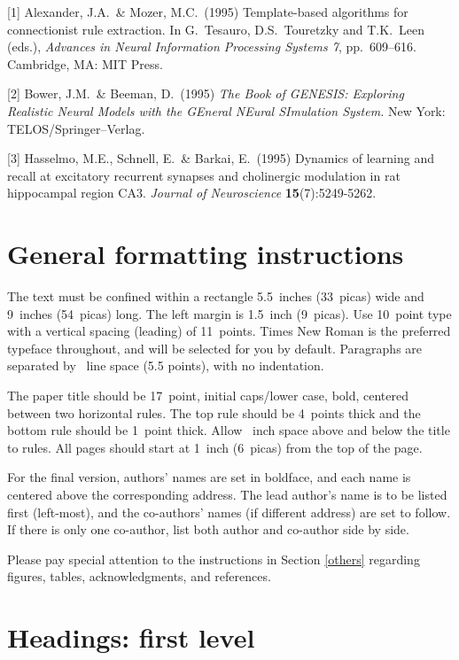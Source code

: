 \documentclass{article}
\begin{document}
{
\small


[1] Alexander, J.A.\ \& Mozer, M.C.\ (1995) Template-based algorithms for
connectionist rule extraction. In G.\ Tesauro, D.S.\ Touretzky and T.K.\ Leen
(eds.), {\it Advances in Neural Information Processing Systems 7},
pp.\ 609--616. Cambridge, MA: MIT Press.


[2] Bower, J.M.\ \& Beeman, D.\ (1995) {\it The Book of GENESIS: Exploring
  Realistic Neural Models with the GEneral NEural SImulation System.}  New York:
TELOS/Springer--Verlag.


[3] Hasselmo, M.E., Schnell, E.\ \& Barkai, E.\ (1995) Dynamics of learning and
recall at excitatory recurrent synapses and cholinergic modulation in rat
hippocampal region CA3. {\it Journal of Neuroscience} {\bf 15}(7):5249-5262.
}

\newpage

\appendix
\section{General formatting instructions}
\label{gen_inst}


The text must be confined within a rectangle 5.5~inches (33~picas) wide and
9~inches (54~picas) long. The left margin is 1.5~inch (9~picas).  Use 10~point
type with a vertical spacing (leading) of 11~points.  Times New Roman is the
preferred typeface throughout, and will be selected for you by default.
Paragraphs are separated by ~line space (5.5 points), with no
indentation.


The paper title should be 17~point, initial caps/lower case, bold, centered
between two horizontal rules. The top rule should be 4~points thick and the
bottom rule should be 1~point thick. Allow ~inch space above and
below the title to rules. All pages should start at 1~inch (6~picas) from the
top of the page.


For the final version, authors' names are set in boldface, and each name is
centered above the corresponding address. The lead author's name is to be listed
first (left-most), and the co-authors' names (if different address) are set to
follow. If there is only one co-author, list both author and co-author side by
side.


Please pay special attention to the instructions in Section \ref{others}
regarding figures, tables, acknowledgments, and references.


\section{Headings: first level}
\label{headings}
\end{document}
